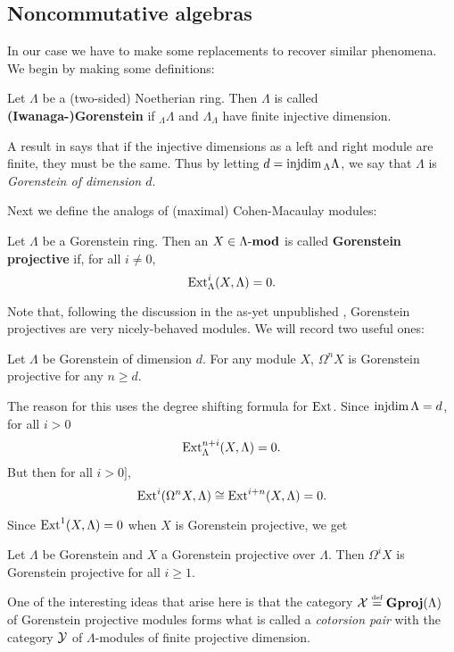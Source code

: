 \documentclass[12pt]{article}
\begin{document}
\subsection{Noncommutative algebras}
In our case we have to make some replacements to recover similar phenomena. We begin by making some definitions:
\begin{defn}
    Let $\Lambda$ be a (two-sided) Noetherian ring.  Then $\Lambda$ is called \textbf{(Iwanaga-)Gorenstein} if $_\Lambda\Lambda$ and $\Lambda_\Lambda$ have finite injective dimension.
\end{defn}
\begin{rmk}
    A result in \cite[Lem. A]{zaks1969} says that if the injective dimensions as a left and right module are finite, they must be the same. Thus by letting $d=\operatorname{injdim} {_\Lambda\Lambda}$,
    we say that $\Lambda$ is \emph{Gorenstein of dimension $d$}.
\end{rmk}

Next we define the analogs of (maximal) Cohen-Macaulay modules:
\begin{defn}
    Let $\Lambda$ be a Gorenstein ring. Then an $X\in\Lambda\text{-}\mathbf{mod}$ is called \textbf{Gorenstein projective} if, for all $i\ne 0$,
    \[\operatorname{Ext}^i_\Lambda(X,\Lambda)=0.\]
\end{defn}

Note that, following the discussion in the as-yet unpublished \cite{krauseII}, Gorenstein projectives are very nicely-behaved modules. We will record two useful ones:
\begin{prop}[Krause 6.2.1(1)]
    Let $\Lambda$ be Gorenstein of dimension $d$. For any module $X$, $\Omega^nX$ is Gorenstein projective for any $n\ge d.$
\end{prop}
The reason for this uses the degree shifting formula for $\operatorname{Ext}$. Since $\operatorname{injdim} \Lambda=d$, for all $i> 0$
\[\operatorname{Ext}_\Lambda^{n+i}(X,\Lambda)=0.\]
But then for all $i>0],$
\[\operatorname{Ext}^i(\Omega^nX,\Lambda)\cong \operatorname{Ext}^{i+n}(X,\Lambda)=0.\]

Since $\operatorname{Ext}^1(X,\Lambda)=0$ when $X$ is Gorenstein projective, we get
\begin{prop}[Krause 6.2.1(2)]
    Let $\Lambda$ be Gorenstein and $X$ a Gorenstein projective over $\Lambda.$ Then $\Omega^iX$ is Gorenstein projective for all $i\ge 1.$
\end{prop}

One of the interesting ideas that arise here is that the category $\mathcal{X}\stackrel{\text{\tiny def}}{=}\mathbf{Gproj}(\Lambda)$ of Gorenstein projective modules forms what is called a \emph{cotorsion pair} with the category $\mathcal{Y}$ of $\Lambda$-modules of finite projective dimension.
\end{document}
